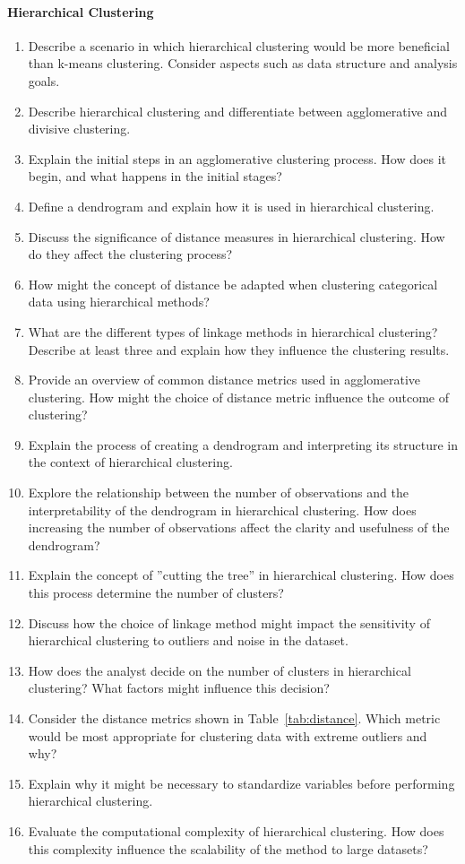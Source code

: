 \paragraph*{Hierarchical Clustering}
\begin{enumerate}
    \item Describe a scenario in which hierarchical clustering would be more beneficial than k-means clustering. Consider aspects such as data structure and analysis goals.
    \item Describe hierarchical clustering and differentiate between agglomerative and divisive clustering.
    \item Explain the initial steps in an agglomerative clustering process. How does it begin, and what happens in the initial stages?
    \item Define a dendrogram and explain how it is used in hierarchical clustering.
    \item Discuss the significance of distance measures in hierarchical clustering. How do they affect the clustering process?
    \item How might the concept of distance be adapted when clustering categorical data using hierarchical methods?
    \item What are the different types of linkage methods in hierarchical clustering? Describe at least three and explain how they influence the clustering results.
    \item Provide an overview of common distance metrics used in agglomerative clustering. How might the choice of distance metric influence the outcome of clustering?
    \item Explain the process of creating a dendrogram and interpreting its structure in the context of hierarchical clustering.
    \item Explore the relationship between the number of observations and the interpretability of the dendrogram in hierarchical clustering. How does increasing the number of observations affect the clarity and usefulness of the dendrogram?
    \item Explain the concept of ''cutting the tree'' in hierarchical clustering. How does this process determine the number of clusters?
    \item Discuss how the choice of linkage method might impact the sensitivity of hierarchical clustering to outliers and noise in the dataset.
    \item How does the analyst decide on the number of clusters in hierarchical clustering? What factors might influence this decision?
    \item Consider the distance metrics shown in Table~\ref{tab:distance}. Which metric would be most appropriate for clustering data with extreme outliers and why?
    \item Explain why it might be necessary to standardize variables before performing hierarchical clustering.
    \item Evaluate the computational complexity of hierarchical clustering. How does this complexity influence the scalability of the method to large datasets?
\end{enumerate}
